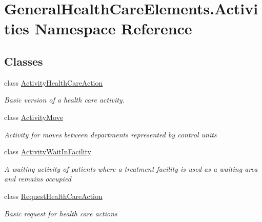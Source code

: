 \hypertarget{namespace_general_health_care_elements_1_1_activities}{}\section{General\+Health\+Care\+Elements.\+Activities Namespace Reference}
\label{namespace_general_health_care_elements_1_1_activities}
\subsection*{Classes}
\begin{DoxyCompactItemize}
\item 
class \hyperlink{class_general_health_care_elements_1_1_activities_1_1_activity_health_care_action}{Activity\+Health\+Care\+Action}
\begin{DoxyCompactList}\small\item\em Basic version of a health care activity. \end{DoxyCompactList}\item 
class \hyperlink{class_general_health_care_elements_1_1_activities_1_1_activity_move}{Activity\+Move}
\begin{DoxyCompactList}\small\item\em Activity for moves between departments represented by control units \end{DoxyCompactList}\item 
class \hyperlink{class_general_health_care_elements_1_1_activities_1_1_activity_wait_in_facility}{Activity\+Wait\+In\+Facility}
\begin{DoxyCompactList}\small\item\em A waiting activity of patients where a treatment facility is used as a waiting area and remains occupied \end{DoxyCompactList}\item 
class \hyperlink{class_general_health_care_elements_1_1_activities_1_1_request_health_care_action}{Request\+Health\+Care\+Action}
\begin{DoxyCompactList}\small\item\em Basic request for health care actions \end{DoxyCompactList}\end{DoxyCompactItemize}
